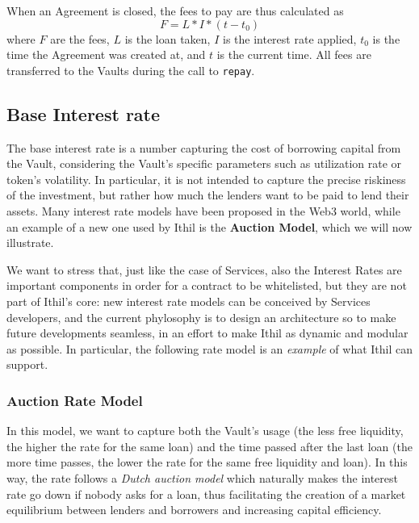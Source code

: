 \documentclass[a4paper,10 pt]{article}
\theoremstyle{definition}
\begin{document}
When an Agreement is closed, the fees to pay are thus calculated as $$F = L * I * (t - t_0) $$ where $F$ are the fees, $L$ is the loan taken, $I$ is the interest rate applied, $t_0$ is the time the Agreement was created at, and $t$ is the current time. All fees are transferred to the Vaults during the call to \verb|repay|.

\subsection{Base Interest rate}\label{interestRateSubSec}
The base interest rate is a number capturing the cost of borrowing capital from the Vault, considering the Vault's specific parameters such as utilization rate or token's volatility. In particular, it is not intended to capture the precise riskiness of the investment, but rather how much the lenders want to be paid to lend their assets.  Many interest rate models have been proposed in the Web3 world, while an example of a new one used by Ithil is the {\bf Auction Model}, which we will now illustrate.

We want to stress that, just like the case of Services, also the Interest Rates are important components in order for a contract to be whitelisted, but they are not part of Ithil's core: new interest rate models can be conceived by Services developers, and the current phylosophy is to design an architecture so to make future developments seamless, in an effort to make Ithil as dynamic and modular as possible. In particular, the following rate model is an {\it example} of what Ithil can support.

\subsubsection{Auction Rate Model}\label{auctionSubSub}
In this model, we want to capture both the Vault's usage (the less free liquidity, the higher the rate for the same loan) and the time passed after the last loan (the more time passes, the lower the rate for the same free liquidity and loan). In this way, the rate follows a {\it Dutch auction model} which naturally makes the interest rate go down if nobody asks for a loan, thus facilitating the creation of a market equilibrium between lenders and borrowers and increasing capital efficiency.
\end{document}
